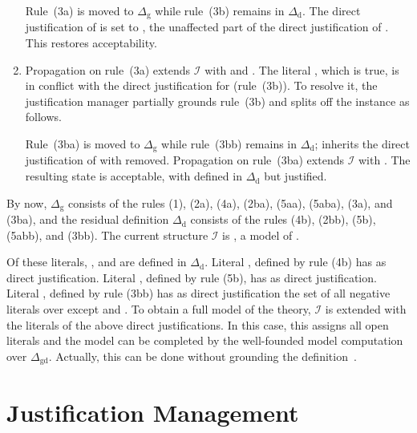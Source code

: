 \documentclass[11pt]{article}
\newcommand{\m}[1]{\ensuremath{#1}\xspace}
\newcommand{\I}{\m{\mathcal{I}}}
\newcommand{\D}{\m{\Delta}}
\theoremstyle{plain}
\theoremstyle{definition}
\theoremstyle{example_basic}
\theoremstyle{example_contd}
\theoremstyle{plain}
\newcommand{\Dg}{\ensuremath{\D_\text{g}}\xspace}
\newcommand{\Dd}{\ensuremath{\D_\text{d}}\xspace}
\newcommand{\Dgd}{\ensuremath{\D_\text{gd}}\xspace}
\newcommand{\change}[1]{#1}
\begin{document}
\begin{enumerate}
  Rule~(3a) is moved to \Dg while rule~(3b) remains in \Dd. 
  \change{The direct justification of   is set to , the unaffected part of the direct justification of . This restores acceptability.}

\item Propagation on rule~(3a) extends \I with  and
  . 
The literal , which is true, is in conflict with the direct
  justification for  (rule~(3b)). To resolve it, the justification manager partially grounds rule~(3b) and splits off the instance  as follows.
  
  Rule~(3ba) is moved to \Dg while rule~(3bb) remains in \Dd;  inherits the direct justification of  with  removed. Propagation on rule~(3ba) extends \I with . The resulting state is acceptable, with  defined in \Dd but justified. 
\end{enumerate}

By now, \Dg consists of the rules (1), (2a), (4a), (2ba), (5aa), (5aba), (3a), and (3ba), and the residual definition \Dd consists of the rules (4b), (2bb), (5b), (5abb), and (3bb). The current structure \I is    , a model of . 

Of these literals, ,  and  are defined in \Dd. Literal , defined by rule (4b) has \change{} as direct justification.  Literal , defined by rule (5b), has  as direct justification. Literal , defined by rule (3bb) has as direct justification the set of all negative  literals over  except  and . To obtain a full model of the theory, \I is extended with the literals of the above direct justifications. In this case, this assigns all open literals and the model can be completed by the well-founded model computation over \Dgd. Actually, this can be done without grounding the definition~\cite{tplp/Jansen13}.

\section{Justification Management}\label{sec:algorithms}

\newcommand{\buildconstr}{\textsf{build\_djust}\xspace}
\newcommand{\csplit}{\textsf{split}\xspace}
\newcommand{\lazyground}{\textsf{lazy\_ground}\xspace}
\newcommand{\lazymx}{\textsf{lazy\_mx}\xspace}

\newcommand{\dstate}{default acceptable state\xspace}

\newcommand{\propagate}{\textsf{propagate}\xspace}
\newcommand{\learnnogood}{\textsf{learn\_nogood}\xspace}
\newcommand{\checkliteral}{\textsf{check\_literal}\xspace}
\newcommand{\splitandground}{\textsf{split\_and\_ground}\xspace}
\newcommand{\construct}{\textsf{justify}\xspace}
\newcommand{\initjust}{\textsf{init\_just}\xspace}
\end{document}
